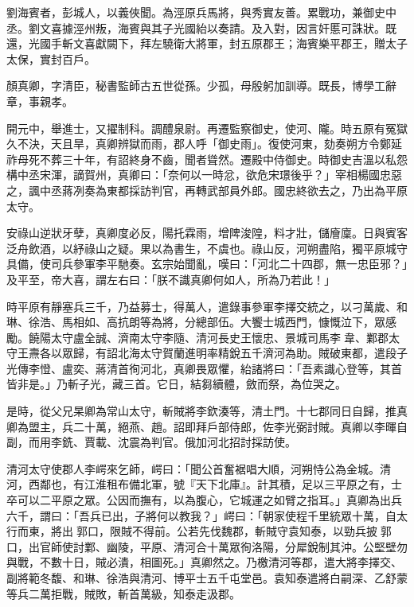 \begin{pinyinscope}
 劉海賓者，彭城人，以義俠聞。為涇原兵馬將，與秀實友善。累戰功，兼御史中丞。劉文喜據涇州叛，海賓與其子光國紿以奏請。及入對，因言奸慝可誅狀。既還，光國手斬文喜獻闕下，拜左驍衛大將軍，封五原郡王；海賓樂平郡王，贈太子太保，實封百戶。



 顏真卿，字清臣，秘書監師古五世從孫。少孤，母殷躬加訓導。既長，博學工辭章，事親孝。



 開元中，舉進士，又擢制科。調醴泉尉。再遷監察御史，使河、隴。時五原有冤獄久不決，天且旱，真卿辨獄而雨，郡人呼「御史雨」。復使河東，劾奏朔方令鄭延祚母死不葬三十年，有詔終身不齒，聞者聳然。遷殿中侍御史。時御史吉溫以私怨構中丞宋渾，謫賀州，真卿曰：「奈何以一時忿，欲危宋璟後乎？」宰相楊國忠惡之，諷中丞蔣冽奏為東都採訪判官，再轉武部員外郎。國忠終欲去之，乃出為平原太守。



 安祿山逆狀牙孽，真卿度必反，陽托霖雨，增陴浚隍，料才壯，儲廥廩。日與賓客泛舟飲酒，以紓祿山之疑。果以為書生，不虞也。祿山反，河朔盡陷，獨平原城守具備，使司兵參軍李平馳奏。玄宗始聞亂，嘆曰：「河北二十四郡，無一忠臣邪？」及平至，帝大喜，謂左右曰：「朕不識真卿何如人，所為乃若此！」



 時平原有靜塞兵三千，乃益募士，得萬人，遣錄事參軍李擇交統之，以刁萬歲、和琳、徐浩、馬相如、高抗朗等為將，分總部伍。大饗士城西門，慷慨泣下，眾感勵。饒陽太守盧全誠、濟南太守李隨、清河長史王懷忠、景城司馬李韋、鄴郡太守王燾各以眾歸，有詔北海太守賀蘭進明率精銳五千濟河為助。賊破東都，遣段子光傳李憕、盧奕、蔣清首徇河北，真卿畏眾懼，紿諸將曰：「吾素識心登等，其首皆非是。」乃斬子光，藏三首。它日，結芻續體，斂而祭，為位哭之。



 是時，從父兄杲卿為常山太守，斬賊將李欽湊等，清土門。十七郡同日自歸，推真卿為盟主，兵二十萬，絕燕、趙。詔即拜戶部侍郎，佐李光弼討賊。真卿以李暉自副，而用李銑、賈載、沈震為判官。俄加河北招討採訪使。



 清河太守使郡人李崿來乞師，崿曰：「聞公首奮裾唱大順，河朔恃公為金城。清河，西鄰也，有江淮租布備北軍，號『天下北庫』。計其積，足以三平原之有，士卒可以二平原之眾。公因而撫有，以為腹心，它城運之如臂之指耳。」真卿為出兵六千，謂曰：「吾兵已出，子將何以教我？」崿曰：「朝家使程千里統眾十萬，自太行而東，將出郭口，限賊不得前。公若先伐魏郡，斬賊守袁知泰，以勁兵披郭口，出官師使討鄴、幽陵，平原、清河合十萬眾徇洛陽，分犀銳制其沖。公堅壁勿與戰，不數十日，賊必潰，相圖死。」真卿然之。乃檄清河等郡，遣大將李擇交、副將範冬馥、和琳、徐浩與清河、博平士五千屯堂邑。袁知泰遣將白嗣深、乙舒蒙等兵二萬拒戰，賊敗，斬首萬級，知泰走汲郡。




\end{pinyinscope}
